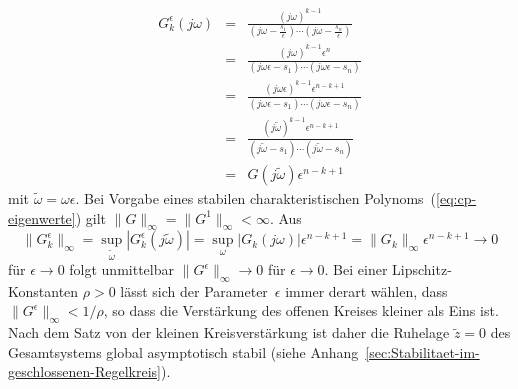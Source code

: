 \begin{svmultproof2}
\[\begin{array}{ccl}
G_{k}^{\epsilon}(j\omega) & = & \frac{\left(j\omega\right)^{k-1}}{\left(j\omega-\frac{s_{1}}{\epsilon}\right)\cdots\left(j\omega-\frac{s_{n}}{\epsilon}\right)}\\
 & = & \frac{\left(j\omega\right)^{k-1}\epsilon^{n}}{\left(j\omega\epsilon-s_{1}\right)\cdots\left(j\omega\epsilon-s_{n}\right)}\\
 & = & \frac{\left(j\omega\epsilon\right)^{k-1}\epsilon^{n-k+1}}{\left(j\omega\epsilon-s_{1}\right)\cdots\left(j\omega\epsilon-s_{n}\right)}\\
 & = & \frac{\left(j\tilde{\omega}\right)^{k-1}\epsilon^{n-k+1}}{\left(j\tilde{\omega}-s_{1}\right)\cdots\left(j\tilde{\omega}-s_{n}\right)}\\
 & = & G(j\tilde{\omega})\epsilon^{n-k+1}
\end{array}
\]
mit $\tilde{\omega}=\omega\epsilon$. Bei Vorgabe eines stabilen charakteristischen
Polynoms~(\ref{eq:cp-eigenwerte}) gilt $\|G\|_{\infty}=\|G^{1}\|_{\infty}<\infty$.
Aus
\[
\|G_{k}^{\epsilon}\|_{\infty}=\sup_{\tilde{\omega}}|G_{k}^{\epsilon}(j\tilde{\omega})|=\sup_{\omega}|G_{k}(j\omega)|\epsilon^{n-k+1}=\|G_{k}\|_{\infty}\epsilon^{n-k+1}\to0
\]
für $\epsilon\to0$ folgt unmittelbar $\|G^{\epsilon}\|_{\infty}\to0$
für $\epsilon\to0$. Bei einer Lipschitz-Konstanten $\rho>0$ lässt
sich der Parameter~$\epsilon$ immer derart wählen, dass $\|G^{\epsilon}\|_{\infty}<1/\rho$,
so dass die Verstärkung des offenen Kreises kleiner als Eins ist.
Nach dem Satz von der kleinen Kreisverstärkung
ist daher die Ruhelage $\tilde{z}=0$ des Gesamtsystems global asymptotisch
stabil (siehe Anhang~\ref{sec:Stabilitaet-im-geschlossenen-Regelkreis}).
\end{svmultproof2}

